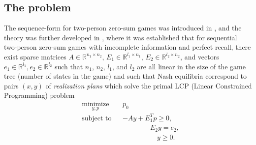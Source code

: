 \documentclass[12pt]{article}
\begin{document}
\subsection{The problem}
The sequence-form for two-person zero-sum games was introduced in \cite{koller1992complexity}, and the theory was further developed in \cite{von1996efficient, vonequilibrium}, where it was established that for sequential two-person zero-sum games with imcomplete information and perfect recall, there exist sparse matrices $A \in \mathbb{R}^{n_1 \times n_2}$, $E_1 \in \mathbb{R}^{l_1 \times n_1}$, $E_2 \in \mathbb{R}^{l_2 \times n_2}$, and vectors $e_1 \in \mathbb{R}^{l_1}, e_2 \in \mathbb{R}^{l_2}$ such that $n_1$, $n_2$, $l_1$, and $l_2$ are all linear in the size of the game tree (number of states in the game) and such that Nash equilibria correspond to pairs $(x, y)$ of \textit{realization plans} which solve the primal LCP (Linear Constrained Programming) problem
\begin{equation}
  \begin{aligned}
    & \underset{y,p}{\text{minimize}}
    & & p_0 \\
    & \text{subject to}
    &&-Ay + E_1^Tp \geq 0,\\
    &&&\hspace{4em}E_2y = e_2,\\
    &&&\hspace{5em} y \ge 0.
  \end{aligned}
  \label{eq:primal_pb}
\end{equation}
\end{document}
